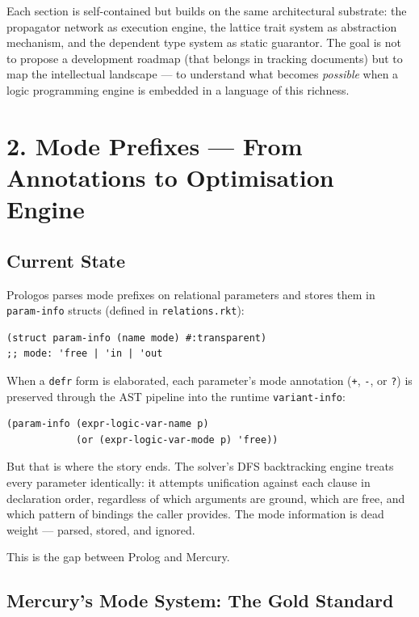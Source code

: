 \documentclass[11pt]{article}
\begin{document}
Each section is self-contained but builds on the same architectural substrate:
the propagator network as execution engine, the lattice trait system as
abstraction mechanism, and the dependent type system as static guarantor. The
goal is not to propose a development roadmap (that belongs in tracking documents)
but to map the intellectual landscape --- to understand what becomes \emph{possible}
when a logic programming engine is embedded in a language of this richness.
\section{2. Mode Prefixes --- From Annotations to Optimisation Engine}
\label{sec:org8c1b44c}

\subsection{Current State}
\label{sec:orgf5c045d}

Prologos parses mode prefixes on relational parameters and stores them in
\texttt{param-info} structs (defined in \texttt{relations.rkt}):

\begin{verbatim}
(struct param-info (name mode) #:transparent)
;; mode: 'free | 'in | 'out
\end{verbatim}

When a \texttt{defr} form is elaborated, each parameter's mode annotation (\texttt{+}, \texttt{-}, or
\texttt{?}) is preserved through the AST pipeline into the runtime \texttt{variant-info}:

\begin{verbatim}
(param-info (expr-logic-var-name p)
            (or (expr-logic-var-mode p) 'free))
\end{verbatim}

But that is where the story ends. The solver's DFS backtracking engine treats
every parameter identically: it attempts unification against each clause in
declaration order, regardless of which arguments are ground, which are free, and
which pattern of bindings the caller provides. The mode information is dead
weight --- parsed, stored, and ignored.

This is the gap between Prolog and Mercury.
\subsection{Mercury's Mode System: The Gold Standard}
\label{sec:org99572d3}
\end{document}
